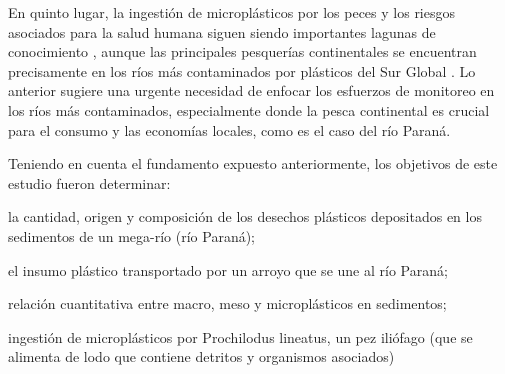 En quinto lugar, la ingestión de microplásticos por los peces y los riesgos asociados para la salud humana siguen siendo importantes lagunas de conocimiento \parencite{SILVACAVALCANTI2017218}, aunque las principales pesquerías continentales se encuentran precisamente en los ríos más contaminados por plásticos \parencite{Lebreton2017} del Sur Global \parencite{Waterland2013}. Lo anterior sugiere una urgente necesidad de enfocar los esfuerzos de monitoreo en los ríos más contaminados, especialmente donde la pesca continental es crucial para el consumo y las economías locales, como es el caso del río Paraná.

Teniendo en cuenta el fundamento expuesto anteriormente, los objetivos de este estudio fueron determinar:
\begin{enumerate*}[label = \( \roman*)]
	\item la cantidad, origen y composición de los desechos plásticos depositados en los sedimentos de un mega-río (río Paraná);
	\item el insumo plástico transportado por un arroyo que se une al río Paraná;
	\item relación cuantitativa entre macro, meso y microplásticos en sedimentos;
	\item ingestión de microplásticos por Prochilodus lineatus, un pez iliófago (que se alimenta de lodo que contiene detritos y organismos asociados)
\end{enumerate*}
